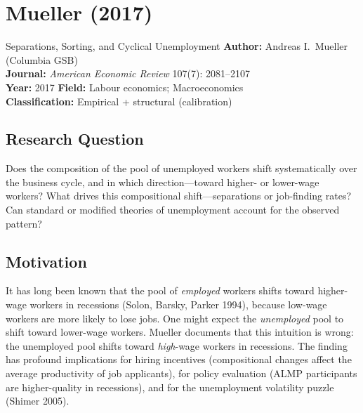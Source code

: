 \chapter{Mueller (2017)}

\begin{paperbox}{Separations, Sorting, and Cyclical Unemployment}
\textbf{Author:} Andreas I.\ Mueller (Columbia GSB)\\[3pt]
\textbf{Journal:} \textit{American Economic Review} 107(7): 2081--2107\\[3pt]
\textbf{Year:} 2017 \quad\textbf{Field:} Labour economics; Macroeconomics\\[3pt]
\textbf{Classification:} Empirical + structural (calibration)
\end{paperbox}

\section{Research Question}

Does the composition of the pool of unemployed workers shift systematically
over the business cycle, and in which direction---toward higher- or lower-wage
workers? What drives this compositional shift---separations or job-finding
rates? Can standard or modified theories of unemployment account for the
observed pattern?

\section{Motivation}

It has long been known that the pool of \emph{employed} workers shifts toward
higher-wage workers in recessions (Solon, Barsky, Parker 1994), because
low-wage workers are more likely to lose jobs. One might expect the
\emph{unemployed} pool to shift toward lower-wage workers. Mueller documents
that this intuition is wrong: the unemployed pool shifts toward
\emph{high}-wage workers in recessions. The finding has profound implications
for hiring incentives (compositional changes affect the average productivity
of job applicants), for policy evaluation (ALMP participants are higher-quality
in recessions), and for the unemployment volatility puzzle (Shimer 2005).


